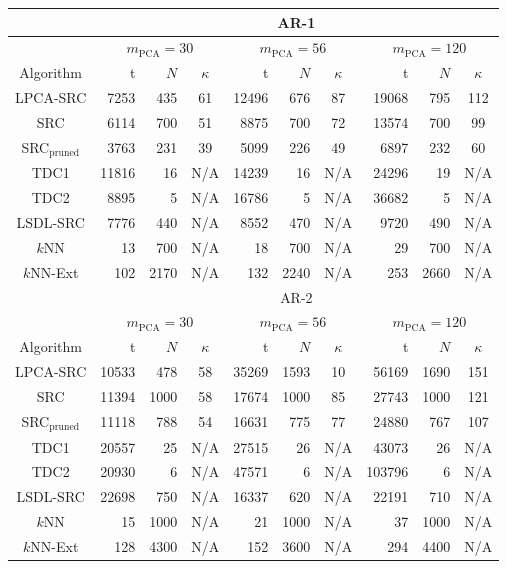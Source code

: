 \documentclass[review]{elsarticle}
\begin{document}
\begin{table}[!htb] 
\footnotesize{
\centering
\begin{tabular}{|c|r|r|c|r|r|c|r|r|c|}
\hline
& \multicolumn{9}{|c|}{AR-1}\\
\hline
& \multicolumn{3}{|c|}{$m_\mathrm{PCA} = 30$} &  \multicolumn{3}{|c|}{$m_\mathrm{PCA} = 56$}    & \multicolumn{3}{|c|}{$m_\mathrm{PCA} = 120$}\\
\hline
Algorithm & t & $N$ & $\kappa$ & t & $N$ & $\kappa$ & t & $N$ & $\kappa$ \\
\hline
LPCA-SRC	          & 7253	& 435	& 61	& 12496	& 676	& 87	 & 19068	& 795	& 112	\\
SRC	                & 6114	& 700	& 51	& 8875	& 700	& 72   & 13574	& 700	& 99\\
SRC$_\mathrm{pruned}$& 3763	& 231	& 39	& 5099	& 226	& 49	 & 6897	& 232	& 60 \\
TDC1	              &	11816	&	16	&	N/A	&	14239	&	16	&	N/A  &	24296	&	19	&	N/A	\\
TDC2	              &	8895	&	5	  &	N/A	&	16786	&	5	  &	N/A  &	36682	&	5	  &	N/A	 \\
LSDL-SRC	          & 7776	& 440	& N/A & 8552	& 470	& N/A  & 9720	& 490	& N/A \\
$k$NN               & 13	  & 700 & N/A	&	18	  & 700 & N/A	 &	29	& 700 & N/A \\
$k$NN-Ext           & 102	  & 2170& N/A	&	132	  & 2240 & N/A &	253	& 2660 & N/A \\


\hline
& \multicolumn{9}{|c|}{AR-2}\\
\hline
& \multicolumn{3}{|c|}{$m_\mathrm{PCA} = 30$} &  \multicolumn{3}{|c|}{$m_\mathrm{PCA} = 56$}    & \multicolumn{3}{|c|}{$m_\mathrm{PCA} = 120$}\\
\hline
Algorithm & t & $N$ & $\kappa$ & t & $N$ & $\kappa$ & t & $N$ & $\kappa$ \\
\hline
LPCA-SRC	          & 10533	 & 478	& 58   & 35269	 & 1593	  & 10     & 56169	  & 1690	& 151 \\
SRC	                & 11394	 & 1000	& 58   & 17674	 & 1000	  & 85     & 27743  	& 1000	& 121 \\
SRC$_\mathrm{pruned}$& 11118	 & 788	& 54 & 16631	 & 775	  & 77     & 24880	  & 767	  & 107 \\
TDC1	              &	20557	 &	25	&	N/A  &	27515	 &	26	  &	N/A    &	43073	  &	26	  &	N/A \\
TDC2	              &	20930	 &	6	  &	N/A  &	47571	 &	6	    &	N/A    &	103796	&	6	    &	N/A \\
LSDL-SRC	          & 22698	 & 750	& N/A  & 16337	 & 620	  & N/A    & 22191	  & 710	  & N/A \\
$k$NN               &	 15  & 1000  & N/A	 &	21	 & 1000    & N/A 	   &	37	  & 1000   & N/A \\
$k$NN-Ext           & 128	 & 4300  & N/A	 &	152	 & 3600    & N/A     &	294	  & 4400   & N/A \\


\end{tabular}}
\end{table}
\end{document}
